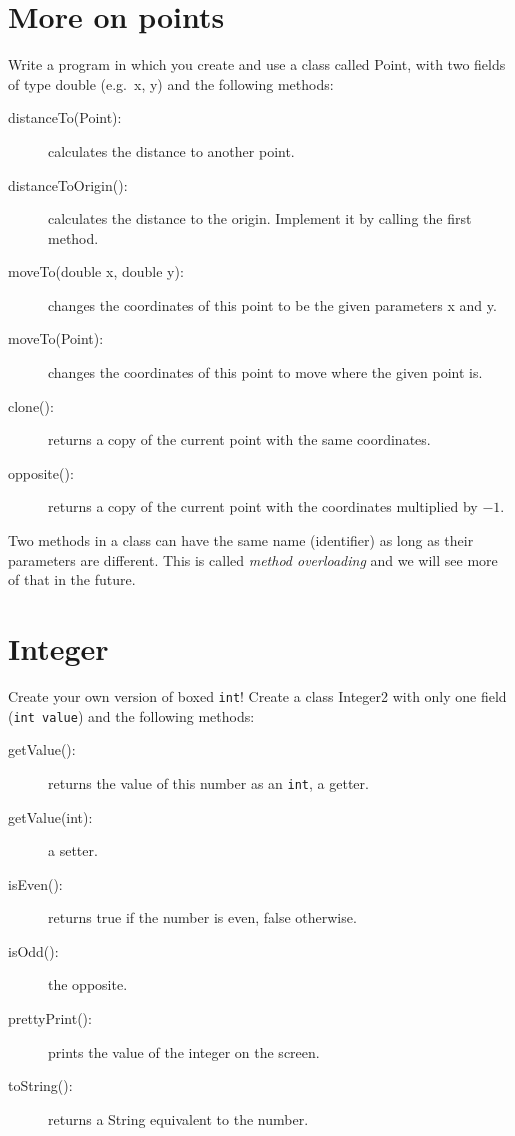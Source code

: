 \documentclass{article}
\begin{document}
\section{More on points}
\label{sec:more-points}

Write a program in which you create and use a class called Point, 
with two fields of type double (e.g.~x, y) and the
following methods: 

\begin{description}
\item[distanceTo(Point): ] calculates the distance to another point.
\item[distanceToOrigin(): ] calculates the distance to the
  origin. Implement it by calling the first method.
\item[moveTo(double x, double y): ] changes the coordinates of this point to
  be the given parameters x and y. 
\item[moveTo(Point): ] changes the coordinates of this point to move
  where the given point is.
\item[clone(): ] returns a copy of the current point with the same
  coordinates.
\item[opposite(): ] returns a copy of the current point with the
  coordinates multiplied by $-1$. 
\end{description}

Two methods in a class can have the same name (identifier) as long as
their parameters are different. This is called \emph{method
  overloading} and we will see more of that in the future.

\section{Integer}
\label{sec:integer}

Create your own version of boxed \verb+int+! Create a class Integer2
with only one field (\verb+int value+) and the following methods: 

\begin{description}
\item[getValue(): ] returns the value of this number as an
  \verb+int+, a getter. 
\item[getValue(int): ] a setter.
\item[isEven(): ] returns true if the number is even, false
  otherwise.
\item[isOdd(): ] the opposite.
\item[prettyPrint(): ] prints the value of the integer on the screen.
\item[toString(): ] returns a String equivalent to the number. 
\end{description}
\end{document}
